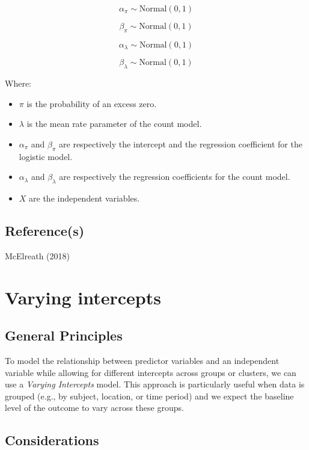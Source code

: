 \documentclass[
  letterpaper,
  DIV=11,
  numbers=noendperiod]{scrreprt}
\begin{document}
\[
\alpha_\pi \sim \text{Normal}(0,1)
\]

\[
\beta_\pi \sim \text{Normal}(0,1)
\]

\[
\alpha_\lambda \sim \text{Normal}(0,1)
\]

\[
\beta_\lambda \sim \text{Normal}(0,1)
\]

Where:

\begin{itemize}
\item
  \(\pi\) is the probability of an excess zero.
\item
  \(\lambda\) is the mean rate parameter of the count model.
\item
  \(\alpha_\pi\) and \(\beta_\pi\) are respectively the intercept and
  the regression coefficient for the logistic model.
\item
  \(\alpha_\lambda\) and \(\beta_\lambda\) are respectively the
  regression coefficients for the count model.
\item
  \(X\) are the independent variables.
\end{itemize}

\section{Reference(s)}\label{references-10}

McElreath (2018)


\chapter{Varying intercepts}\label{varying-intercepts}

\section{General Principles}\label{general-principles-11}

To model the relationship between predictor variables and an independent
variable while allowing for different intercepts across groups or
clusters, we can use a \emph{Varying Intercepts} model. This approach is
particularly useful when data is grouped (e.g., by subject, location, or
time period) and we expect the baseline level of the outcome to vary
across these groups.

\section{Considerations}\label{considerations-11}
\end{document}
